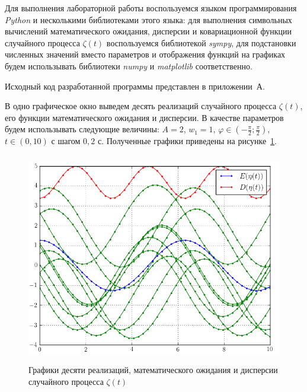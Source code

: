 Для выполнения лабораторной работы воспользуемся языком программирования
\textit{Python} и несколькими библиотеками этого языка:
для выполнения символьных вычислений математического ожидания, дисперсии и
ковариационной функции случайного процесса $ \zeta(t) $ воспользуемся библиотекой
\textit{sympy}, для подстановки численных значений вместо параметров и отображения функций
на графиках будем использывать библиотеки \textit{numpy} и \textit{matplotlib} соответственно.

Исходный код разработанной программы представлен в приложении~А.


В одно графическое окно выведем десять реализаций случайного процесса $ \zeta(t) $,
его функции математического ожидания и дисперсии. В качестве параметров будем использывать
следующие величины: $ A = 2 $, $ w_1 = 1 $, $ \varphi \in (-\frac{\pi}{2}; \frac{\pi}{2}) $,
$ t \in (0, 10) $ с шагом $ 0{,}2 $ с. Полученные графики приведены на рисунке~\ref{pic:values}.
\begin{figure}[h]
  \centering
  \includegraphics[width=150mm, height=92mm]{pic/values}
  \caption{Графики десяти реализаций, математического ожидания и дисперсии случайного процесса $ \zeta(t) $}
  \label{pic:values} 
\end{figure}

\pagebreak

